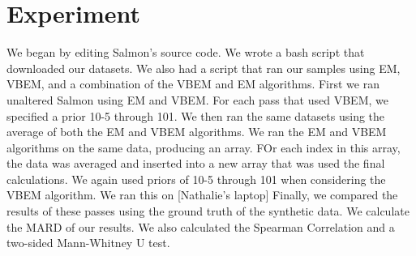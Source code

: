 \section{Experiment}

We began by editing Salmon’s source code. We wrote a bash script that downloaded our datasets. We also had a script that ran our samples using EM, VBEM, and a combination of the VBEM and EM algorithms. 
First we ran unaltered Salmon using EM and VBEM. For each pass that used VBEM, we specified a prior 10-5 through 101. 
	We then ran the same datasets using the average of both the EM and VBEM algorithms. We ran the EM and VBEM algorithms on the same data, producing an array. FOr each index in this array, the data was averaged and inserted into a new array that was used the final calculations. We again used priors of 10-5 through 101 when considering the VBEM algorithm. 
	We ran this on [Nathalie’s laptop]
	Finally, we compared the results of these passes using the ground truth of the synthetic data. We calculate the MARD of our results. We also calculated the Spearman Correlation and a two-sided Mann-Whitney U test. 

	